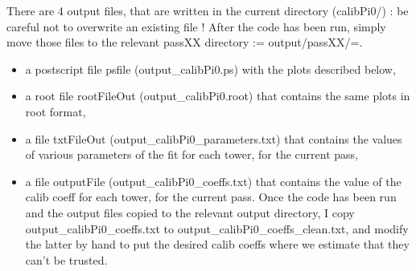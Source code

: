 There are 4 output files, that are written in the current directory (calibPi0/) : be careful not to overwrite an existing file ! After the code has been run, simply move those files to the relevant passXX directory := output/passXX/=.
\begin{itemize}
\item a postscript file psfile (output\_calibPi0.ps) with the plots described below,
\item a root file rootFileOut (output\_calibPi0.root) that contains the same plots in root format,
\item a file txtFileOut (output\_calibPi0\_parameters.txt) that contains the values of various parameters of the fit for each tower, for the current pass,
\item a file outputFile (output\_calibPi0\_coeffs.txt) that contains the value of the calib coeff for each tower, for the current pass.
Once the code has been run and the output files copied to the relevant output directory, I copy output\_calibPi0\_coeffs.txt to output\_calibPi0\_coeffs\_clean.txt, and modify the latter by hand to put the desired calib coeffs where we estimate that they can't be trusted.
\end{itemize}

